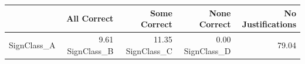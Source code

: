 \begin{tabular}{lrrrr}
\toprule
 & All Correct & Some Correct & None Correct & No Justifications \\
\midrule
SignClass_A & 9.61%
SignClass_B & 11.35%
SignClass_C & 0.00%
SignClass_D & 79.04%
\bottomrule
\end{tabular}
